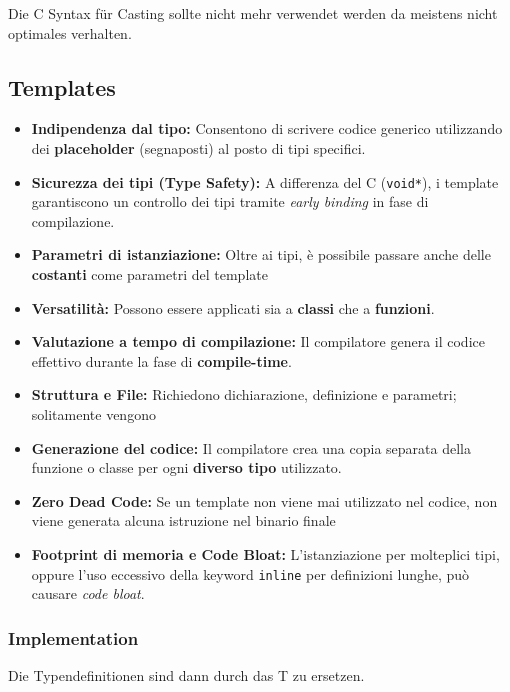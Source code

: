 Die C Syntax für Casting sollte nicht mehr verwendet werden da meistens nicht optimales verhalten. 

\subsection{Templates}

\begin{itemize}
\item \textbf{Indipendenza dal tipo:} Consentono di scrivere codice generico utilizzando dei \textbf{placeholder} (segnaposti) al posto di tipi specifici.
\item \textbf{Sicurezza dei tipi (Type Safety):} A differenza del C 
(\lstinline|void*|), i template garantiscono un controllo dei tipi tramite \textit{early binding} in fase di compilazione.
\item \textbf{Parametri di istanziazione:} Oltre ai tipi, è possibile 
passare anche delle \textbf{costanti} come parametri del template 
\item \textbf{Versatilità:} Possono essere applicati sia a \textbf{classi} che a 
\textbf{funzioni}.
\item \textbf{Valutazione a tempo di compilazione:} Il compilatore genera il codice 
effettivo durante la fase di \textbf{compile-time}.
\item \textbf{Struttura e File:} Richiedono dichiarazione, definizione e parametri; 
solitamente vengono 
\item \textbf{Generazione del codice:} Il compilatore crea una copia separata della 
funzione o classe per ogni \textbf{diverso tipo} utilizzato.
\item \textbf{Zero Dead Code:} Se un template non viene mai utilizzato nel codice, 
non viene generata alcuna istruzione nel binario finale
\item \textbf{Footprint di memoria e Code Bloat:} L'istanziazione per molteplici tipi, 
oppure l'uso eccessivo della keyword \lstinline|inline| per definizioni lunghe, 
può causare \textit{code bloat}.
\end{itemize}

\subsubsection{Implementation}

Die Typendefinitionen sind dann durch das T zu ersetzen. 

\vspace{-1.5em}

